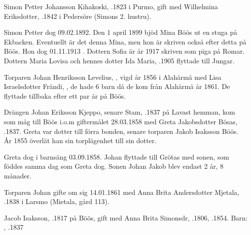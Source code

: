 Simon Petter Johansson Kihakoski, .1823 i Purmo, gift med Wilhelmina Eriksdotter, .1842 i Pedersöre (Simons 2. hustru).
\begin{jhchildren}
  \item {}
  \item {}
  \item {}
  \item {}
  \item {}
\end{jhchildren}
Simon Petter dog 09.02.1892. Den 1 april 1899 bjöd Mina Böös ut en stuga på Ekbacken. Eventuellt är det denna Mina, men hon är skriven också efter detta på Böös. Hon dog 01.11.1913 . Dottern Sofia är år 1917 skriven som piga på Romar. Dottern Maria Lovisa och hennes dotter Ida Maria, .1905 flyttade till Jungar.


Torparen Johan Henriksson Levelius, , vigd år 1856 i Alahärmä med Lisa Israelsdotter Frändi, , de hade 6 barn då de kom från Alahärmä år 1861. De flyttade tillbaka efter ett par år på Böös.


Drängen Johan Eriksson Kjeppo, senare Stam, .1837 på Lavast hemman, kom som måg till Böös i.o.m giftermålet 28.03.1858 med Greta Jakobsdotter Bösas, .1837. Greta var dotter till förra bonden, senare torparen Jakob Isaksson Böös. År 1855 överlät han sin torplägenhet till sin dotter.

Greta dog i barnsäng 03.09.1858. Johan flyttade till Grötas med sonen, som föddes samma dag som Greta dog. Sonen Johan Jakob blev endast 2 år, 8 månader.

Torparen Johan gifte om sig 14.01.1861 med Anna Brita Andersdotter Mjetala, .1838 i Larsmo (Mietala, gård 113).


Jacob Isaksson, .1817 på Böös, gift med Anna Brita Simonsdr, .1806, .1854.
Barn:	 , .1837

